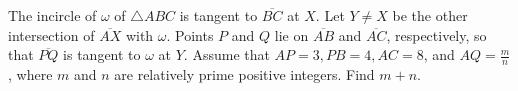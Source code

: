 The incircle of $\omega$ of $\triangle ABC$ is tangent to $\overline{BC}$ at $X$. Let $Y \neq X$ be the other intersection of $\overline{AX}$ with $\omega$. Points $P$ and $Q$ lie on  $\overline{AB}$ and $\overline{AC}$, respectively, so that $\overline{PQ}$ is tangent to $\omega$ at $Y$. Assume that $AP=3, PB = 4, AC=8$, and $AQ = \tfrac{m}{n}$, where  $m$ and $n$ are relatively prime positive integers. Find $m+n$.